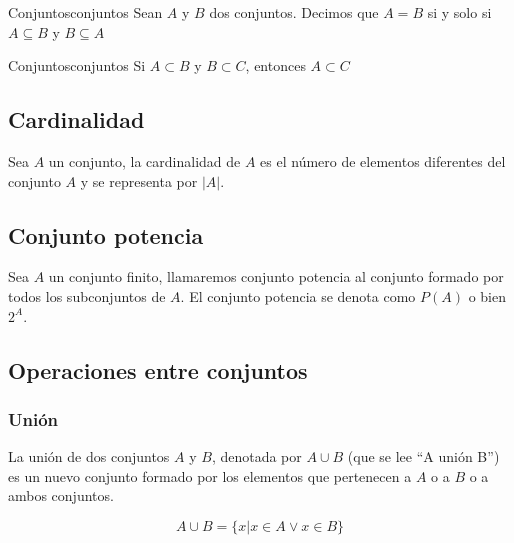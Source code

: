 \begin{theorem}{Conjuntos}{conjuntos}
Sean $A$ y $B$ dos conjuntos. Decimos que $A=B$ si y solo si $A \subseteq B$ y
$B \subseteq A$
\end{theorem}

\begin{theorem}{Conjuntos}{conjuntos}
    Si $ A \subset B $ y $ B \subset C $, entonces $ A \subset C $
\end{theorem}

\subsection{Cardinalidad}

Sea $A$ un conjunto, la cardinalidad de $A$ es el número de elementos diferentes
del conjunto $A$ y se representa por $|A|$.

\subsection{Conjunto potencia}
Sea $A$ un conjunto finito, llamaremos conjunto potencia al conjunto formado por
todos los subconjuntos de $A$. El conjunto potencia se denota como $P(A)$ o bien
$2^A$.

\subsection{Operaciones entre conjuntos}

\def\firstcircle{(0,0) circle (1.5cm)}
\def\secondcircle{(0:2cm) circle (1.5cm)}
\def\rectangle{(-2,-2) rectangle (4,2)}



\setlength{\parskip}{5mm}

\subsubsection{Unión}

La unión de dos conjuntos $A$ y $B$, denotada por $ A \cup B $ (que se lee “A
unión B”) es un nuevo conjunto formado por los elementos que pertenecen a $A$ o
a $B$ o a ambos conjuntos.

\begin{equation}
    A \cup B = \{x | x \in A \vee x \in B\}
\end{equation}

